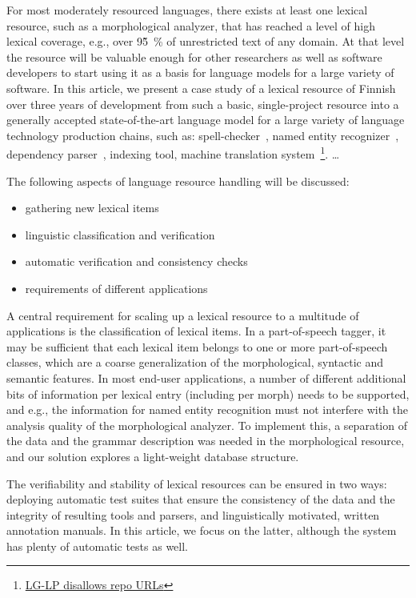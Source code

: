 \documentclass[11pt]{article}
\begin{document}
For most moderately resourced languages, there exists at least one lexical
resource, such as a morphological analyzer, that has reached a level of high
lexical coverage, e.g., over 95̃~\% of unrestricted text of any domain.  At that
level the resource will be valuable enough for other researchers as well as
software developers to start using it as a basis for language models for a
large variety of software. In this article, we present a case study of a
lexical resource of Finnish over three years of development from such a basic,
single-project resource into a generally accepted state-of-the-art language
model for a large variety of language technology production chains, such as:
spell-checker~\cite{pirinen2014weighted}, named entity
recognizer~\cite{huovelinsoftware}, dependency parser~\cite{bohnet2013joint}, indexing
tool, machine translation system~\footnote{\url{LG-LP disallows repo URLs}}.
\ldots

The following aspects of language resource handling will be discussed:
\begin{itemize}
    \item gathering new lexical items
    \item linguistic classification and verification
    \item automatic verification and consistency checks
    \item requirements of different applications
\end{itemize}

A central requirement for scaling up a lexical resource to a multitude of
applications is the classification of lexical items. In a part-of-speech
tagger, it may be sufficient that each lexical item belongs to one or more
part-of-speech classes, which are a coarse generalization of the morphological,
syntactic and semantic features. In most end-user applications, a number of
different additional bits of information per lexical entry (including per
morph) needs to be supported, and e.g., the information for named entity
recognition must not interfere with the analysis quality of the morphological
analyzer. To implement this, a separation of the data and the grammar
description was needed in the morphological resource, and our solution explores
a light-weight database structure.

The verifiability and stability of lexical resources can be ensured in two
ways: deploying automatic test suites that ensure the consistency of the data
and the integrity of resulting tools and parsers, and linguistically motivated,
written annotation manuals. In this article, we focus on the latter, although
the system has plenty of automatic tests as well.
\end{document}
